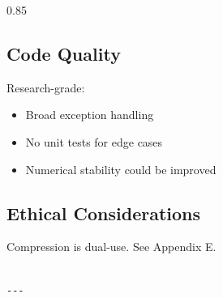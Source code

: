 0.85

\subsection{Code Quality}

Research-grade:
\begin{itemize}
\item Broad exception handling
\item No unit tests for edge cases
\item Numerical stability could be improved

\end{itemize}
\subsection{Ethical Considerations}

Compression is dual-use. See Appendix E.
\begin{lstlisting}

---
\end{lstlisting}